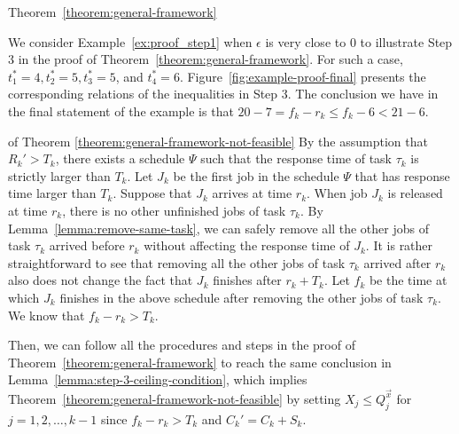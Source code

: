\begin{appProof}{Theorem~\ref{theorem:general-framework}}
\begin{example}
  We consider Example~\ref{ex:proof_step1} when $\epsilon$ is very
  close to $0$ to illustrate Step 3 in the proof of
  Theorem~\ref{theorem:general-framework}. For such a case, $t_1^*=4,
  t_2^*=5, t_3^*=5$, and $t_4^*=6$.
  Figure~\ref{fig:example-proof-final} presents the corresponding
  relations of the inequalities in Step 3.
The conclusion we have in the final statement of the example is that $20-7=f_k-r_k \leq  f_k-6 < 21-6$.
\end{example}
\vspace{-0.3in}
\end{appProof}


\begin{appProof}{of Theorem \ref{theorem:general-framework-not-feasible}}
  By the assumption that $R_k' > T_k$, there exists a schedule $\Psi$
  such that the response time of task $\tau_k$ is strictly larger than
  $T_k$. Let $J_k$ be the first job in the schedule $\Psi$ that has
  response time larger than $T_k$. Suppose that $J_{k}$ arrives at
  time $r_k$. When job $J_k$ is released at time $r_k$, there is no
  other unfinished jobs of task $\tau_k$. By
  Lemma~\ref{lemma:remove-same-task}, we can safely remove all the
  other jobs of task $\tau_k$ arrived before $r_k$ without affecting
  the response time of $J_k$. It is rather straightforward to see that
  removing all the other jobs of task $\tau_k$ arrived after $r_k$
  also does not change the fact that $J_k$ finishes after
  $r_k+T_k$. Let $f_k$ be the time at which $J_k$ finishes in the
  above schedule after removing the other jobs of task $\tau_k$. We
  know that $f_k - r_k > T_k$.

  Then, we can follow all the procedures and steps in the proof of
  Theorem~\ref{theorem:general-framework} to reach the same conclusion
  in Lemma~\ref{lemma:step-3-ceiling-condition}, which implies
  Theorem~\ref{theorem:general-framework-not-feasible} by setting $X_j
  \leq Q_j^{\vec{x}}$ for $j=1,2,\ldots,k-1$ since $f_k-r_k > T_k$ and
  $C_k'=C_k+S_k$.
\end{appProof}




